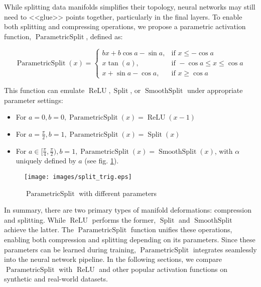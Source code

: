 \documentclass{esannV2}
\DeclareMathOperator{\relu}{\mathrm{ReLU}}
\DeclareMathOperator{\signsplit}{\mathrm{Split}}
\DeclareMathOperator{\smoothsplit}{\mathrm{SmoothSplit}}
\DeclareMathOperator{\parametricsplit}{\mathrm{ParametricSplit}}
\begin{document}

While splitting data manifolds simplifies their topology, neural networks may still need to <<glue>> points together, particularly in the final layers. To enable both splitting and compressing operations, we propose a parametric activation function, \( \parametricsplit \), defined as:

$$ \parametricsplit(x) = \begin{cases}
    bx + b\cos{a} - \sin{a}, & \text{if } x\leq-\cos{a}              \\
    x\tan(a),                & \text{if } -\cos{a} \le x \le \cos{a} \\
    x + \sin{a} - \cos{a},   & \text{if } x\geq \cos{a}
  \end{cases} $$

This function can emulate $\relu, \signsplit$, or $\smoothsplit$ under appropriate parameter settings:
\begin{itemize}
  \item For $a=0, b=0, \parametricsplit(x) = \relu(x-1)$
  \item For $a=\frac{\pi}{2}, b=1, \parametricsplit(x) = \signsplit(x)$
  \item For $a\in[\frac{\pi}{4}, \frac{\pi}{2}), b=1, \parametricsplit(x)=\smoothsplit(x)$, with $\alpha$ uniquely defined by $a$ (see fig. \ref{fig:split-trig}).  %
\end{itemize}

\begin{figure}[!htbp]
  \centering
  \texttt{[image: images/split\_trig.eps]}
  \caption{$\parametricsplit$ with different parameters}
  \label{fig:split-trig}
\end{figure}

In summary, there are two primary types of manifold deformations: compression and splitting. While \( \relu \) performs the former, \( \signsplit \) and \( \smoothsplit \) achieve the latter. The \( \parametricsplit \) function unifies these operations, enabling both compression and splitting depending on its parameters. Since these parameters can be learned during training, \( \parametricsplit \) integrates seamlessly into the neural network pipeline. In the following sections, we compare \( \parametricsplit \) with \( \relu \) and other popular activation functions on synthetic and real-world datasets.
\end{document}
